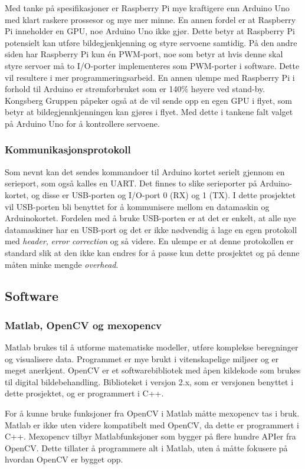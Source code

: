 Med tanke på spesifikasjoner er Raspberry Pi mye kraftigere enn Arduino Uno med klart raskere prossesor og mye mer minne. En annen fordel er at Raspberry Pi inneholder en GPU, noe Arduino Uno ikke gjør. Dette betyr at Raspberry Pi potensielt kan utføre bildegjenkjenning og styre servoene samtidig. På den andre siden har Raspberry Pi kun én PWM-port, noe som betyr at hvis denne skal styre servoer må to I/O-porter implementeres som PWM-porter i software. Dette vil resultere i mer programmeringsarbeid. En annen ulempe med Raspberry Pi i forhold til Arduino er strømforbruket som er 140\% høyere ved stand-by.\cite{ArduinoSpec,RpiSpec} Kongsberg Gruppen påpeker også at de vil sende opp en egen GPU i flyet, som betyr at bildegjennkjenningen kan gjøres i flyet. Med dette i tankene falt valget på Arduino Uno for å kontrollere servoene.

\subsubsection{Kommunikasjonsprotokoll}

Som nevnt kan det sendes kommandoer til Arduino kortet serielt gjennom en serieport, som også kalles en UART. Det finnes to slike serieporter på Arduino-kortet, og disse er USB-porten og I/O-port 0 (RX) og 1 (TX). I dette prosjektet vil USB-porten bli benyttet for å kommunisere mellom en datamaskin og Arduinokortet. Fordelen med å bruke USB-porten er at det er enkelt, at alle nye datamaskiner har en USB-port og det er ikke nødvendig å lage en egen protokoll med \emph{header}, \emph{error correction} og så videre. En ulempe er at denne protokollen er standard slik at den ikke kan endres for å passe kun dette prosjektet og på denne måten minke mengde \emph{overhead}.

\subsection{Software}

\subsubsection{Matlab, OpenCV og mexopencv}
Matlab brukes til å utforme matematiske modeller, utføre komplekse beregninger og visualisere data. \cite{matlab} Programmet er mye brukt i vitenskapelige miljøer og er meget anerkjent. 
OpenCV er et softwarebibliotek med åpen kildekode som brukes til digital bildebehandling. Biblioteket i versjon 2.x, som er versjonen benyttet i dette prosjektet, og er programmert i C++. \cite{docs:opencv}

For å kunne bruke funksjoner fra OpenCV i Matlab måtte mexopencv tas i bruk. Matlab er ikke uten videre kompatibelt med OpenCV, da dette er programmert i C++. Mexopencv tilbyr Matlabfunksjoner som bygger på flere hundre APIer fra OpenCV. \cite{mexopencv} Dette tillater å programmere alt i Matlab, uten å måtte fokusere på hvordan OpenCV er bygget opp. 
